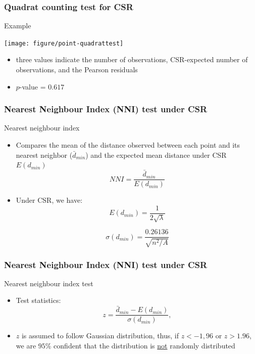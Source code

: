 \documentclass[10pt]{beamer}\usepackage[]{graphicx}\usepackage[]{color}
\newcommand{\bitemize}{\begin{itemize}}
\newcommand{\eitemize}{\end{itemize}}
\newcommand{\bblock}{\begin{block}}
\newcommand{\eblock}{\end{block}}
\begin{document}
\begin{frame}
\frametitle{Quadrat counting test for CSR}

\bblock{Example}
\vspace{-1cm}


{\centering \texttt{[image: figure/point-quadrattest]} 

}




\bitemize
\item three values indicate the number of observations, CSR-expected number of observations, and the Pearson residuals 
\item $p$-value = $0.617$
\eitemize
\eblock
\end{frame}

\begin{frame}
\frametitle{Nearest Neighbour Index (NNI) test under CSR}

\bblock{Nearest neighbour index}
\bitemize
\item Compares the mean of the distance observed between each point and its nearest neighbor ($\bar{d}_{min}$) and the expected mean distance under CSR $E(d_{min})$
\[
NNI=\frac{\bar{d}_{min}}{E(d_{min})}
\]
\item Under CSR, we have:
\[
E(d_{min})=\frac{1}{2\sqrt{\lambda}}
\]

\[
\sigma(d_{min})=\frac{0.26136}{\sqrt{{n^2}/{A}}}
\]
\eitemize
\eblock

\end{frame}

\begin{frame}
\frametitle{Nearest Neighbour Index (NNI) test under CSR}


\bblock{Nearest neighbour index test}
\bitemize
\item Test statistics:
\[
z=\frac{\bar{d}_{min}-E(d_{min})}{\sigma(d_{min})},
\]
\item $z$ is assumed to follow Gaussian distribution, thus, if $z<-1,96$ or $z>1.96$, we are $95\%$ confident that the distribution is \underline {not} randomly distributed
\eitemize
\eblock
\end{frame}
\end{document}
